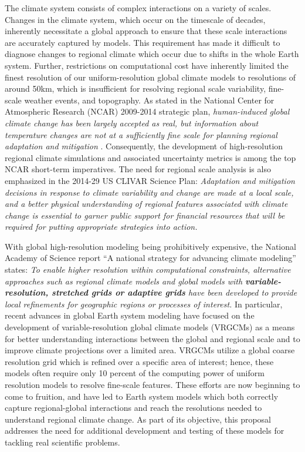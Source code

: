 \documentclass[11pt]{article}
\begin{document}
The climate system consists of complex interactions on a variety of scales. Changes in the climate system, which occur on the timescale of decades, inherently necessitate a global approach to ensure that these scale interactions are accurately captured by models. This requirement has made it difficult to diagnose changes to regional climate which occur due to shifts in the whole Earth system. Further, restrictions on computational cost have inherently limited the finest resolution of our uniform-resolution global climate models to resolutions of around 50km, which is insufficient for resolving regional scale variability, fine-scale weather events, and topography. As stated in the National Center for Atmospheric Research (NCAR) 2009-2014 strategic plan, \textit{human-induced global climate change has been largely accepted as real, but information about temperature changes are not at a sufficiently fine scale for planning regional adaptation and mitigation} \citep{NCAR2009}. Consequently, the development of high-resolution regional climate simulations and associated uncertainty metrics is among the top NCAR short-term imperatives.  The need for regional scale analysis is also emphasized in the 2014-29 US CLIVAR Science Plan: \textit{Adaptation and mitigation decisions in response to climate variability and change are made at a local scale, and a better physical understanding of regional features associated with climate change is essential to garner public support for financial resources that will be required for putting appropriate strategies into action.}

With global high-resolution modeling being prohibitively expensive, the National Academy of Science report ``A national strategy for advancing climate modeling'' states: \textit{To enable higher resolution within computational constraints, alternative approaches such as regional climate models and global models with \textbf{variable-resolution, stretched grids or adaptive grids} have been developed to provide local refinements for geographic regions or processes of interest.}  In particular, recent advances in global Earth system modeling have focused on the development of variable-resolution global climate models (VRGCMs) as a means for better understanding interactions between the global and regional scale and to improve climate projections over a limited area.  VRGCMs utilize a global coarse resolution grid which is refined over a specific area of interest; hence, these models often require only 10 percent of the computing power of uniform resolution models to resolve fine-scale features. These efforts are now beginning to come to fruition, and have led to Earth system models which both correctly capture regional-global interactions and reach the resolutions needed to understand regional climate change.   As part of its objective, this proposal addresses the need for additional development and testing of these models for tackling real scientific problems.
\end{document}
